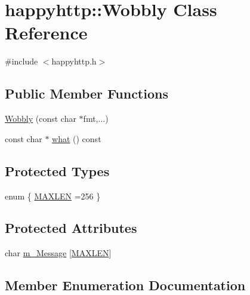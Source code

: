\hypertarget{classhappyhttp_1_1_wobbly}{}\section{happyhttp\+:\+:Wobbly Class Reference}
\label{classhappyhttp_1_1_wobbly}


{\ttfamily \#include $<$happyhttp.\+h$>$}

\subsection*{Public Member Functions}
\begin{DoxyCompactItemize}
\item 
\hyperlink{classhappyhttp_1_1_wobbly_aa6e4f9c911b4076b265c8a9458f67c17}{Wobbly} (const char $\ast$fmt,...)
\item 
const char $\ast$ \hyperlink{classhappyhttp_1_1_wobbly_a181a6dc0c8f2cddda423c93072fcb4ae}{what} () const 
\end{DoxyCompactItemize}
\subsection*{Protected Types}
\begin{DoxyCompactItemize}
\item 
enum \{ \hyperlink{classhappyhttp_1_1_wobbly_a966ec204f4019c907295bae57f12885caf1daeea7c23fbb6811fd2b45b80bca27}{M\+A\+X\+L\+EN} =256
 \}
\end{DoxyCompactItemize}
\subsection*{Protected Attributes}
\begin{DoxyCompactItemize}
\item 
char \hyperlink{classhappyhttp_1_1_wobbly_a7c91015cad62f74bd30cc4eaacd5e522}{m\+\_\+\+Message} \mbox{[}\hyperlink{classhappyhttp_1_1_wobbly_a966ec204f4019c907295bae57f12885caf1daeea7c23fbb6811fd2b45b80bca27}{M\+A\+X\+L\+EN}\mbox{]}
\end{DoxyCompactItemize}


\subsection{Member Enumeration Documentation}
